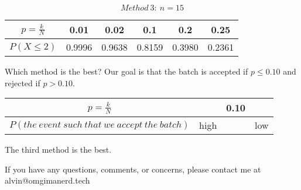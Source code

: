 \documentclass[letterpaper, 12pt]{math}
\begin{document}
\[ Method\ 3:\ n = 15 \]
\begin{center}
  \begin{tabular}{|c|c|c|c|c|c|}
    \hline
    \( p = \frac{k}{N} \) & 0.01 & 0.02 & 0.1 & 0.2 & 0.25 \\
    \hline
    \( P(X\leq 2) \) & 0.9996 & 0.9638 & 0.8159 & 0.3980 & 0.2361 \\
    \hline
  \end{tabular}
\end{center}
Which method is the best? Our goal is that the batch is accepted if
\( p \leq 0.10 \) and rejected if \( p > 0.10 \).
\begin{center}
  \begin{tabular}{|c|c|c|c|}
    \hline
    \( p = \frac{k}{N} \) & & 0.10 & \\
    \hline
    \( P(the\ event\ such\ that\ we\ accept\ the\ batch) \) & high & & low \\
    \hline
  \end{tabular}
\end{center}
The third method is the best.

\begin{center}
  If you have any questions, comments, or concerns, please contact me at
  alvin@omgimanerd.tech
\end{center}
\end{document}
